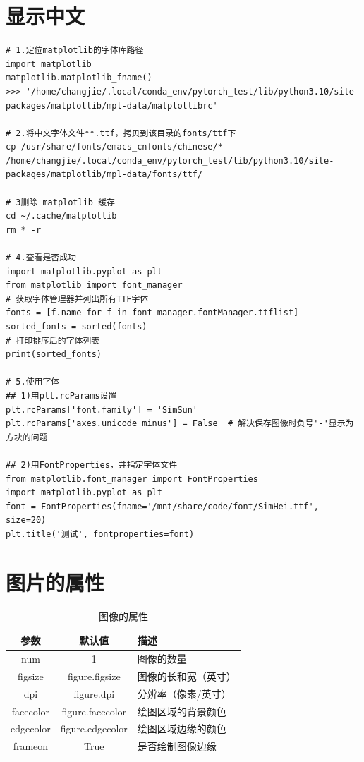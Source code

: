\section{显示中文}
\begin{lstlisting}[style=demostyle,numbers=none]
# 1.定位matplotlib的字体库路径
import matplotlib
matplotlib.matplotlib_fname()
>>> '/home/changjie/.local/conda_env/pytorch_test/lib/python3.10/site-packages/matplotlib/mpl-data/matplotlibrc'

# 2.将中文字体文件**.ttf，拷贝到该目录的fonts/ttf下
cp /usr/share/fonts/emacs_cnfonts/chinese/* /home/changjie/.local/conda_env/pytorch_test/lib/python3.10/site-packages/matplotlib/mpl-data/fonts/ttf/

# 3删除 matplotlib 缓存
cd ~/.cache/matplotlib
rm * -r

# 4.查看是否成功
import matplotlib.pyplot as plt  
from matplotlib import font_manager  
# 获取字体管理器并列出所有TTF字体  
fonts = [f.name for f in font_manager.fontManager.ttflist]  
sorted_fonts = sorted(fonts)  
# 打印排序后的字体列表  
print(sorted_fonts)

# 5.使用字体
## 1)用plt.rcParams设置
plt.rcParams['font.family'] = 'SimSun'   
plt.rcParams['axes.unicode_minus'] = False  # 解决保存图像时负号'-'显示为方块的问题

## 2)用FontProperties，并指定字体文件
from matplotlib.font_manager import FontProperties
import matplotlib.pyplot as plt
font = FontProperties(fname='/mnt/share/code/font/SimHei.ttf', size=20)
plt.title('测试', fontproperties=font)
\end{lstlisting}  

\section{图片的属性}
\begin{table}[h]
    \centering
    \begin{tabular}{|c|c|l|}
    \hline
    \textbf{参数} & \textbf{默认值} & \textbf{描述}                 \\ \hline
    num           & 1               & 图像的数量                   \\ \hline
    figsize       & figure.figsize  & 图像的长和宽（英寸）         \\ \hline
    dpi           & figure.dpi      & 分辨率（像素/英寸）           \\ \hline
    facecolor     & figure.facecolor & 绘图区域的背景颜色           \\ \hline
    edgecolor     & figure.edgecolor & 绘图区域边缘的颜色           \\ \hline
    frameon       & True            & 是否绘制图像边缘             \\ \hline
    \end{tabular}
    \caption{图像的属性}
\end{table}

